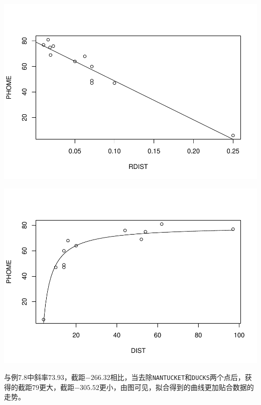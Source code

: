 \documentclass[]{article}
\newenvironment{Shaded}{\begin{snugshade}}{\end{snugshade}}
\newcommand{\DataTypeTok}[1]{\textcolor[rgb]{0.13,0.29,0.53}{#1}}
\newcommand{\DecValTok}[1]{\textcolor[rgb]{0.00,0.00,0.81}{#1}}
\newcommand{\KeywordTok}[1]{\textcolor[rgb]{0.13,0.29,0.53}{\textbf{#1}}}
\newcommand{\NormalTok}[1]{#1}
\newcommand{\OperatorTok}[1]{\textcolor[rgb]{0.81,0.36,0.00}{\textbf{#1}}}
\newcommand{\OtherTok}[1]{\textcolor[rgb]{0.56,0.35,0.01}{#1}}
\newcommand{\StringTok}[1]{\textcolor[rgb]{0.31,0.60,0.02}{#1}}
\begin{document}
\includegraphics{Homework_7_files/figure-latex/unnamed-chunk-7-1.pdf}

\begin{Shaded}
\end{Shaded}

\includegraphics{Homework_7_files/figure-latex/unnamed-chunk-7-2.pdf}

与例7.8中斜率\(73.93\)，截距\(-266.32\)相比，当去除\texttt{NANTUCKET}和\texttt{DUCKS}两个点后，获得的截距\(79\)更大，截距\(-305.52\)更小，由图可见，拟合得到的曲线更加贴合数据的走势。
\end{document}
